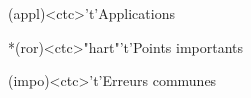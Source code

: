 \documentclass[../../main/main.tex]{subfiles}
\begin{document}
\begin{tcn}[sidebyside, fontupper=\small, fontlower=\small]
	\begin{tcn}(appl)<ctc>'t'{Applications}
	\end{tcn}
	\begin{tcn}*(ror)<ctc>"hart"'t'{Points importants}
	\end{tcn}
	\begin{tcn}(impo)<ctc>'t'{Erreurs communes}
	\end{tcn}
\end{tcn}

\vspace*{\fill}
\newpage
\end{document}
